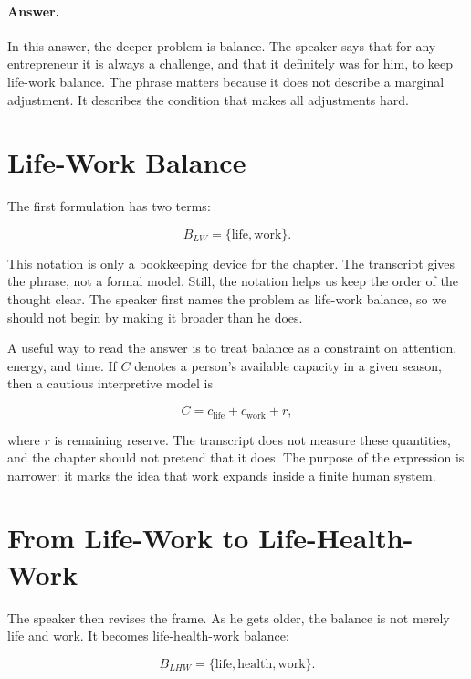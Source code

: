 \paragraph{Answer.}
In this answer, the deeper problem is balance. The speaker says that for any entrepreneur it is always a challenge, and that it definitely was for him, to keep life-work balance. The phrase matters because it does not describe a marginal adjustment. It describes the condition that makes all adjustments hard.

\section{Life-Work Balance}

The first formulation has two terms:

\begin{equation}
B_{LW}=\{\text{life},\text{work}\}.
\end{equation}

This notation is only a bookkeeping device for the chapter. The transcript gives the phrase, not a formal model. Still, the notation helps us keep the order of the thought clear. The speaker first names the problem as life-work balance, so we should not begin by making it broader than he does.

A useful way to read the answer is to treat balance as a constraint on attention, energy, and time. If \(C\) denotes a person's available capacity in a given season, then a cautious interpretive model is

\begin{equation}
C = c_{\text{life}} + c_{\text{work}} + r,
\end{equation}

where \(r\) is remaining reserve. The transcript does not measure these quantities, and the chapter should not pretend that it does. The purpose of the expression is narrower: it marks the idea that work expands inside a finite human system.

\section{From Life-Work to Life-Health-Work}

The speaker then revises the frame. As he gets older, the balance is not merely life and work. It becomes life-health-work balance:

\begin{equation}
B_{LHW}=\{\text{life},\text{health},\text{work}\}.
\end{equation}

